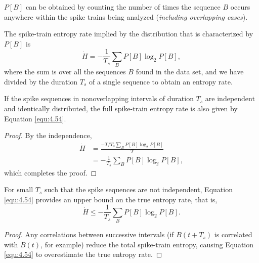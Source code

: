 \begin{rem}
  $P[B]$ can be obtained by counting the number of times the sequence $B$ occurs anywhere within the spike trains being analyzed (\emph{including overlapping cases}).
\end{rem}

\begin{prop}
  The spike-train entropy rate implied by the distribution that is characterized by $P[B]$ is
  \begin{equation}
    \label{equ:4.54}
    \dot{H} = -\frac{1}{T_{s}}\sum\limits_{B}P[B]\log_{2}P[B],
  \end{equation}
  where the sum is over all the sequences $B$ found in the data set, and we have divided by the duration $T_{s}$ of a single sequence to obtain an entropy rate.
\end{prop}

\begin{prop}
  If the spike sequences in nonoverlapping intervals of duration $T_{s}$ are independent and identically distributed, the full spike-train entropy rate is also given by Equation \ref{equ:4.54}.
\end{prop}
\begin{proof}
  By the independence,
  \begin{displaymath}
    \begin{aligned}
      \dot{H} &= \frac{-T/T_{s}\sum\limits_{B}P[B]\log_{2}P[B]}{T} \\
      &= -\frac{1}{T_{s}}\sum\limits_{B}P[B]\log_{2}P[B],
    \end{aligned}
  \end{displaymath}
  which completes the proof.
\end{proof}

\begin{thm}
  For small $T_{s}$ such that the spike sequences are not independent, Equation \ref{equ:4.54} provides an upper bound on the true entropy rate, that is,
  \begin{equation}
    \label{eq:upper1}
    \dot{H} \leq -\frac{1}{T_{s}}\sum\limits_{B}P[B]\log_{2}P[B].
  \end{equation}
\end{thm}
\begin{proof}
  Any correlations between successive intervals (if $B(t+T_{s})$ is correlated with $B(t)$, for example) reduce the total spike-train entropy, causing Equation \ref{equ:4.54} to overestimate the true entropy rate.
\end{proof}


